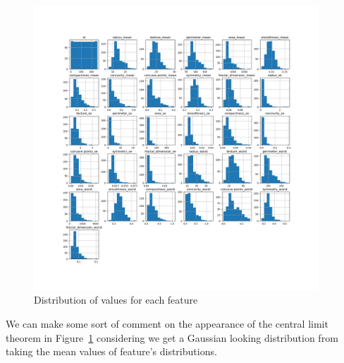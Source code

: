 \documentclass[12pt, a4paper]{article}
\begin{document}
    \begin{figure}[H]
        \begin{center}
            \includegraphics[width=0.95\textwidth]{figures/Data feature histograms.png}
        \end{center}
        \caption{Distribution of values for each feature}\label{fig:hists}
    \end{figure}

\begin{multicols}{2}

    We can make some sort of comment on the appearance of the central limit theorem in Figure~\ref{fig:hists} considering we get a Gaussian looking distribution \cite{kwak_central_2017} from taking the mean values of feature's distributions.
    \newline

\end{multicols}
\end{document}
